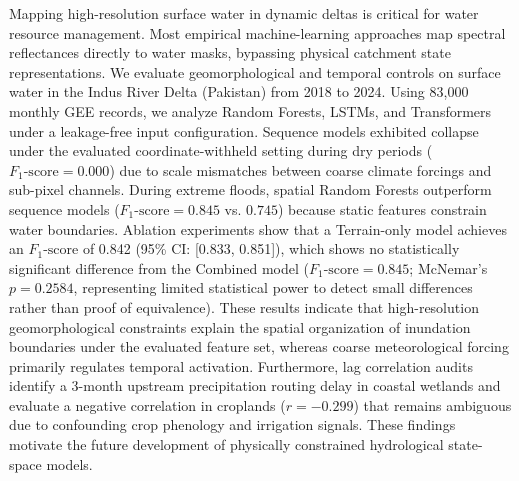 Mapping high-resolution surface water in dynamic deltas is critical for water resource management. Most empirical machine-learning approaches map spectral reflectances directly to water masks, bypassing physical catchment state representations. We evaluate geomorphological and temporal controls on surface water in the Indus River Delta (Pakistan) from 2018 to 2024. Using 83,000 monthly GEE records, we analyze Random Forests, LSTMs, and Transformers under a leakage-free input configuration. Sequence models exhibited collapse under the evaluated coordinate-withheld setting during dry periods ($F_1\text{-score} = 0.000$) due to scale mismatches between coarse climate forcings and sub-pixel channels. During extreme floods, spatial Random Forests outperform sequence models ($F_1\text{-score} = 0.845$ vs. $0.745$) because static features constrain water boundaries. Ablation experiments show that a Terrain-only model achieves an $F_1\text{-score}$ of 0.842 (95\% CI: [0.833, 0.851]), which shows no statistically significant difference from the Combined model ($F_1\text{-score} = 0.845$; McNemar's $p = 0.2584$, representing limited statistical power to detect small differences rather than proof of equivalence). These results indicate that high-resolution geomorphological constraints explain the spatial organization of inundation boundaries under the evaluated feature set, whereas coarse meteorological forcing primarily regulates temporal activation. Furthermore, lag correlation audits identify a 3-month upstream precipitation routing delay in coastal wetlands and evaluate a negative correlation in croplands ($r = -0.299$) that remains ambiguous due to confounding crop phenology and irrigation signals. These findings motivate the future development of physically constrained hydrological state-space models.
